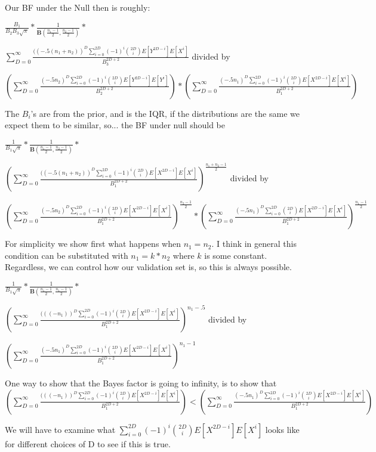 \documentclass[11pt]{article}
\begin{document}
Our BF under the Null then is roughly:

$\frac{B_1}{B_2 B_3 \sqrt{\pi}} * \frac{1}{ \mathbf{B}(\frac{n_1 -1}{2}, \frac{n_2 -1}{2})} * $

$\sum_{D=0}^\infty \frac{((-.5(n_1 + n_2))^D \sum_{i=0}^{2D} (-1)^i \binom{2D}{i}E[Y^{2D-i}]E[X^{i}]}{B_3^{2D+2}}$ divided by 


$ (\sum_{D=0}^\infty \frac{(-.5n_2)^D \sum_{i=0}^{2D} (-1)^i \binom{2D}{i}E[Y^{2D-i}]E[Y^{i}]}{B_2^{2D+2}}) * (\sum_{D=0}^\infty \frac{(-.5n_1)^D \sum_{i=0}^{2D} (-1)^i \binom{2D}{i}E[X^{2D-i}]E[X^{i}]}{B_1^{2D+2}}) $

The $B_i$'s are from the prior, and is the IQR, if the distributions are the same we expect them to be similar, so... the BF under null should be

$\frac{1}{B_1 \sqrt{\pi}} * \frac{1}{ \mathbf{B}(\frac{n_1 -1}{2}, \frac{n_2 -1}{2})} * $

$(\sum_{D=0}^\infty \frac{((-.5(n_1 + n_2))^D \sum_{i=0}^{2D} (-1)^i \binom{2D}{i}E[X^{2D-i}]E[X^{i}]}{B_1^{2D+2}})^{\frac{n_1+n_2 - 1}{2}}$ divided by 


$ (\sum_{D=0}^\infty \frac{(-.5n_2)^D \sum_{i=0}^{2D} (-1)^i \binom{2D}{i}E[X^{2D-i}]E[X^{i}]}{B_1^{2D+2}})^{\frac{n_2 - 1}{2}} * (\sum_{D=0}^\infty \frac{(-.5n_1)^D \sum_{i=0}^{2D} \binom{2D}{i}E[X^{2D-i}]E[X^{i}]}{B_1^{2D+2}})^{\frac{n_1 - 1}{2}} $

For simplicity we show first what happens when $n_1 = n_2$. I think in general this condition can be substituted with $n_1 = k * n_2$ where $k$ is some constant. Regardless, we can control how our validation set is, so this is always possible.

$\frac{1}{B_1 \sqrt{\pi}} * \frac{1}{ \mathbf{B}(\frac{n_1 -1}{2}, \frac{n_1 -1}{2})} * $

$(\sum_{D=0}^\infty \frac{(((-n_1))^D \sum_{i=0}^{2D} (-1)^i \binom{2D}{i}E[X^{2D-i}]E[X^{i}]}{B_1^{2D+2}})^{n_1- .5}$ divided by 

$ (\sum_{D=0}^\infty \frac{(-.5n_1)^D \sum_{i=0}^{2D} (-1)^i \binom{2D}{i}E[X^{2D-i}]E[X^{i}]}{B_1^{2D+2}})^{n_1- 1} $ 

One way to show that the Bayes factor is going to infinity, is to show that $(\sum_{D=0}^\infty \frac{(((-n_1))^D \sum_{i=0}^{2D} (-1)^i \binom{2D}{i}E[X^{2D-i}]E[X^{i}]}{B_1^{2D+2}}) <  (\sum_{D=0}^\infty \frac{(-.5n_1)^D \sum_{i=0}^{2D} (-1)^i \binom{2D}{i}E[X^{2D-i}]E[X^{i}]}{B_1^{2D+2}})$

We will have to examine what $\sum_{i=0}^{2D} (-1)^i \binom{2D}{i}E[X^{2D-i}]E[X^{i}]$ looks like for different choices of D to see if this is true.
\end{document}
